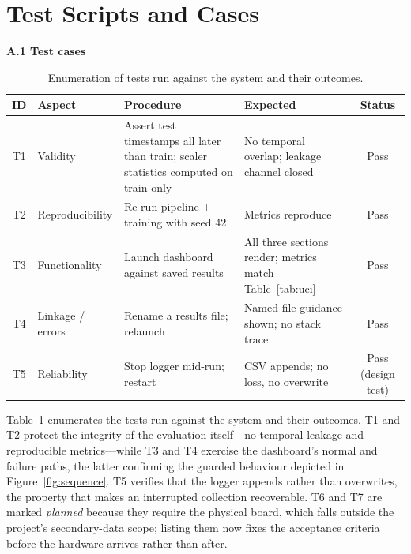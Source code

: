 \documentclass[11pt,a4paper]{article}
\begin{document}
\section{Test Scripts and Cases}
\noindent\textbf{A.1 Test cases}\par\smallskip
\begin{table}[htbp]
\centering
\small
\label{tab:test_cases}
\begin{tabularx}{\textwidth}{|c|l|X|X|c|}
\hline
\textbf{ID} & \textbf{Aspect} & \textbf{Procedure} & \textbf{Expected} & \textbf{Status} \\ \hline
T1 & Validity & Assert test timestamps all later than train; scaler statistics computed on train only & No temporal overlap; leakage channel closed & Pass \\ \hline
T2 & Reproducibility & Re-run pipeline + training with seed 42 & Metrics reproduce & Pass \\ \hline
T3 & Functionality & Launch dashboard against saved results & All three sections render; metrics match Table~\ref{tab:uci} & Pass \\ \hline
T4 & Linkage / errors & Rename a results file; relaunch & Named-file guidance shown; no stack trace & Pass \\ \hline
T5 & Reliability & Stop logger mid-run; restart & CSV appends; no loss, no overwrite & Pass (design test) \\ \hline
\end{tabularx}
\caption{Enumeration of tests run against the system and their outcomes.}
\end{table}

Table~\ref{tab:test_cases} enumerates the tests run against the system and their outcomes. T1 and T2 protect the integrity of the evaluation itself---no temporal leakage and reproducible metrics---while T3 and T4 exercise the dashboard's normal and failure paths, the latter confirming the guarded behaviour depicted in Figure~\ref{fig:sequence}. T5 verifies that the logger appends rather than overwrites, the property that makes an interrupted collection recoverable. T6 and T7 are marked \emph{planned} because they require the physical board, which falls outside the project's secondary-data scope; listing them now fixes the acceptance criteria before the hardware arrives rather than after.

\bigskip
\end{document}
